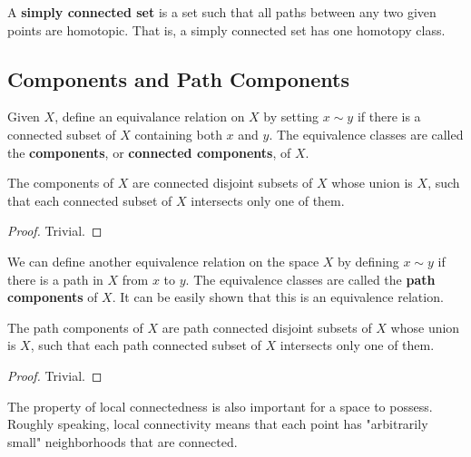     \begin{definition}
      A \textbf{simply connected set} is a set such that all paths between any two given points are homotopic. That is, a simply connected set has one homotopy class. 
    \end{definition}

  \subsection{Components and Path Components}

    \begin{definition}
      Given $X$, define an equivalance relation on $X$ by setting $x \sim y$ if there is a connected subset of $X$ containing both $x$ and $y$. The equivalence classes are called the \textbf{components}, or \textbf{connected components}, of $X$. 
    \end{definition}

    \begin{theorem}
      The components of $X$ are connected disjoint subsets of $X$ whose union is $X$, such that each connected subset of $X$ intersects only one of them. 
    \end{theorem}
    \begin{proof}
      Trivial. 
    \end{proof}

    \begin{definition}
      We can define another equivalence relation on the space $X$ by defining $x \sim y$ if there is a path in $X$ from $x$ to $y$. The equivalence classes are called the \textbf{path components} of $X$. It can be easily shown that this is an equivalence relation. 
    \end{definition}

    \begin{theorem}
      The path components of $X$ are path connected disjoint subsets of $X$ whose union is $X$, such that each path connected subset of $X$ intersects only one of them. 
    \end{theorem}
    \begin{proof}
      Trivial.
    \end{proof}

    The property of local connectedness is also important for a space to possess. Roughly speaking, local connectivity means that each point has "arbitrarily small" neighborhoods that are connected. 

